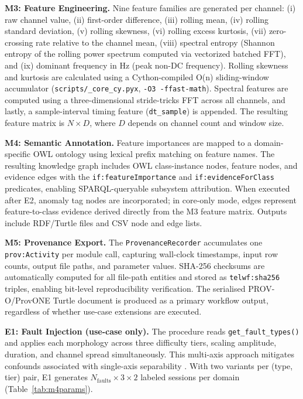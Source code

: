 \documentclass[conference]{IEEEtran}
\begin{document}
\textbf{M3: Feature Engineering.} Nine feature families are generated per channel: (i) raw channel value, (ii) first-order difference, (iii) rolling mean, (iv) rolling standard deviation, (v) rolling skewness, (vi) rolling excess kurtosis, (vii) zero-crossing rate relative to the channel mean, (viii) spectral entropy (Shannon entropy of the rolling power spectrum computed via vectorized batched FFT), and (ix) dominant frequency in Hz (peak non-DC frequency). Rolling skewness and kurtosis are calculated using a Cython-compiled O(n) sliding-window accumulator (\texttt{scripts/\_core\_cy.pyx}, \texttt{-O3 -ffast-math}). Spectral features are computed using a three-dimensional stride-tricks FFT across all channels, and lastly, a sample-interval timing feature (\texttt{dt\_sample}) is appended. The resulting feature matrix is $N \times D$, where $D$ depends on channel count and window size.

\textbf{M4: Semantic Annotation.} Feature importances are mapped to a domain-specific OWL ontology using lexical prefix matching on feature names. The resulting knowledge graph includes OWL class-instance nodes, feature nodes, and evidence edges with the \texttt{if:featureImportance} and \texttt{if:evidenceForClass} predicates, enabling SPARQL-queryable subsystem attribution. When executed after E2, anomaly tag nodes are incorporated; in core-only mode, edges represent feature-to-class evidence derived directly from the M3 feature matrix. Outputs include RDF/Turtle files and CSV node and edge lists.

\textbf{M5: Provenance Export.} The \texttt{ProvenanceRecorder} accumulates one \texttt{prov:Activity} per module call, capturing wall-clock timestamps, input row counts, output file paths, and parameter values. SHA-256 checksums are automatically computed for all file-path entities and stored as \texttt{telwf:sha256} triples, enabling bit-level reproducibility verification. The serialised PROV-O/ProvONE Turtle document is produced as a primary workflow output, regardless of whether use-case extensions are executed.

\textbf{E1: Fault Injection (use-case only).} The procedure reads \texttt{get\_fault\_types()} and applies each morphology across three difficulty tiers, scaling amplitude, duration, and channel spread simultaneously. This multi-axis approach mitigates confounds associated with single-axis separability \cite{wu2022benchmarks}. With two variants per (type, tier) pair, E1 generates $N_{\text{faults}} \times 3 \times 2$ labeled sessions per domain (Table~\ref{tab:m4params}).
\end{document}
